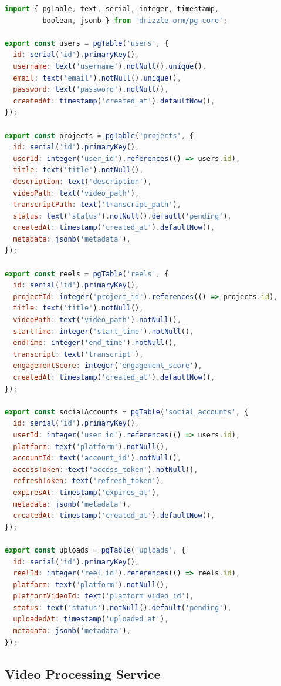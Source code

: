 \begin{lstlisting}[language=JavaScript, caption=shared/schema.ts - Database tables definition]
import { pgTable, text, serial, integer, timestamp, 
         boolean, jsonb } from 'drizzle-orm/pg-core';

export const users = pgTable('users', {
  id: serial('id').primaryKey(),
  username: text('username').notNull().unique(),
  email: text('email').notNull().unique(),
  password: text('password').notNull(),
  createdAt: timestamp('created_at').defaultNow(),
});

export const projects = pgTable('projects', {
  id: serial('id').primaryKey(),
  userId: integer('user_id').references(() => users.id),
  title: text('title').notNull(),
  description: text('description'),
  videoPath: text('video_path'),
  transcriptPath: text('transcript_path'),
  status: text('status').notNull().default('pending'),
  createdAt: timestamp('created_at').defaultNow(),
  metadata: jsonb('metadata'),
});

export const reels = pgTable('reels', {
  id: serial('id').primaryKey(),
  projectId: integer('project_id').references(() => projects.id),
  title: text('title').notNull(),
  videoPath: text('video_path').notNull(),
  startTime: integer('start_time').notNull(),
  endTime: integer('end_time').notNull(),
  transcript: text('transcript'),
  engagementScore: integer('engagement_score'),
  createdAt: timestamp('created_at').defaultNow(),
});

export const socialAccounts = pgTable('social_accounts', {
  id: serial('id').primaryKey(),
  userId: integer('user_id').references(() => users.id),
  platform: text('platform').notNull(),
  accountId: text('account_id').notNull(),
  accessToken: text('access_token').notNull(),
  refreshToken: text('refresh_token'),
  expiresAt: timestamp('expires_at'),
  metadata: jsonb('metadata'),
  createdAt: timestamp('created_at').defaultNow(),
});

export const uploads = pgTable('uploads', {
  id: serial('id').primaryKey(),
  reelId: integer('reel_id').references(() => reels.id),
  platform: text('platform').notNull(),
  platformVideoId: text('platform_video_id'),
  status: text('status').notNull().default('pending'),
  uploadedAt: timestamp('uploaded_at'),
  metadata: jsonb('metadata'),
});
\end{lstlisting}

\subsection{Video Processing Service}

